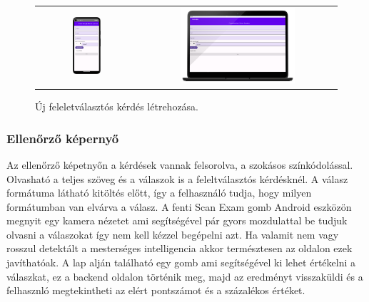 \begin{figure}[!ht]
    \centering
    \begin{tabular}{cc}
        \includegraphics[width=0.3\textwidth, keepaspectratio]{figures/New_Android.png} & 
        \includegraphics[width=0.6\textwidth, keepaspectratio]{figures/New_Desktop_framed.png}
    \end{tabular}
    \caption{Új feleletválasztós kérdés létrehozása.}
    \label{fig:NewScreen}
\end{figure}


\subsubsection{Ellenőrző képernyő}

Az ellenőrző képetnyőn a kérdések vannak felsorolva, a szokásos színkódolással.
Olvasható a teljes szöveg és a válaszok is a feleltválasztós kérdésknél. 
A válasz formátuma látható kitöltés előtt, így a felhasználó tudja, hogy milyen formátumban van elvárva a válasz.
A fenti Scan Exam gomb Android eszközön megnyit egy kamera nézetet ami segítségével pár gyors mozdulattal be tudjuk olvasni a válaszokat így nem kell kézzel begépelni azt.
Ha valamit nem vagy rosszul detektált a mesterséges intelligencia akkor természtesen az oldalon ezek javíthatóak.
A lap alján található egy gomb ami segítségével ki lehet értékelni a válaszkat, ez a backend oldalon történik meg, majd az eredményt visszaküldi és a felhasznló megtekintheti az elért pontszámot és a százalékos értéket.


